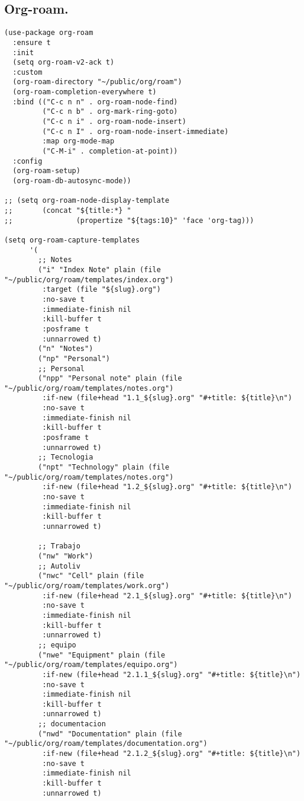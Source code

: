 \documentclass[11pt]{article}
\begin{document}
\subsection{Org-roam.}
\label{sec:org24784e3}
\begin{verbatim}
(use-package org-roam
  :ensure t
  :init
  (setq org-roam-v2-ack t)
  :custom
  (org-roam-directory "~/public/org/roam")
  (org-roam-completion-everywhere t)
  :bind (("C-c n n" . org-roam-node-find)
         ("C-c n b" . org-mark-ring-goto)
         ("C-c n i" . org-roam-node-insert)
         ("C-c n I" . org-roam-node-insert-immediate)
         :map org-mode-map
         ("C-M-i" . completion-at-point))
  :config
  (org-roam-setup)
  (org-roam-db-autosync-mode))

;; (setq org-roam-node-display-template
;;       (concat "${title:*} "
;;               (propertize "${tags:10}" 'face 'org-tag)))

(setq org-roam-capture-templates
      '(
        ;; Notes
        ("i" "Index Note" plain (file "~/public/org/roam/templates/index.org")
         :target (file "${slug}.org")
         :no-save t
         :immediate-finish nil
         :kill-buffer t
         :posframe t 
         :unnarrowed t)
        ("n" "Notes")
        ("np" "Personal")
        ;; Personal
        ("npp" "Personal note" plain (file "~/public/org/roam/templates/notes.org")
         :if-new (file+head "1.1_${slug}.org" "#+title: ${title}\n")
         :no-save t
         :immediate-finish nil
         :kill-buffer t
         :posframe t 
         :unnarrowed t)
        ;; Tecnologia
        ("npt" "Technology" plain (file "~/public/org/roam/templates/notes.org")
         :if-new (file+head "1.2_${slug}.org" "#+title: ${title}\n")
         :no-save t
         :immediate-finish nil
         :kill-buffer t
         :unnarrowed t)

        ;; Trabajo
        ("nw" "Work")
        ;; Autoliv
        ("nwc" "Cell" plain (file "~/public/org/roam/templates/work.org")
         :if-new (file+head "2.1_${slug}.org" "#+title: ${title}\n")
         :no-save t
         :immediate-finish nil
         :kill-buffer t
         :unnarrowed t)
        ;; equipo
        ("nwe" "Equipment" plain (file "~/public/org/roam/templates/equipo.org")
         :if-new (file+head "2.1.1_${slug}.org" "#+title: ${title}\n")
         :no-save t
         :immediate-finish nil
         :kill-buffer t
         :unnarrowed t)
        ;; documentacion
        ("nwd" "Documentation" plain (file "~/public/org/roam/templates/documentation.org")
         :if-new (file+head "2.1.2_${slug}.org" "#+title: ${title}\n")
         :no-save t
         :immediate-finish nil
         :kill-buffer t
         :unnarrowed t)


\end{verbatim}
\end{document}
